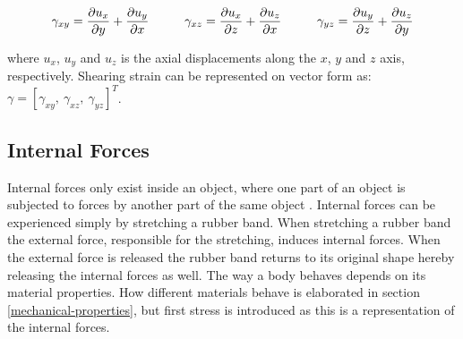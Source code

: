 \begin{equation}
\label{eq:individual-shear-strain}
  \gamma_{xy} = \frac{\partial u_x}{\partial y} +
  \frac{\partial u_y}{\partial x} \hspace{10 mm}
  \gamma_{xz} = \frac{\partial u_x}{\partial z} +
  \frac{\partial u_z}{\partial x} \hspace{10 mm}
  \gamma_{yz} = \frac{\partial u_y}{\partial z} +
  \frac{\partial u_z}{\partial y}
\end{equation}

where $u_x$, $u_y$ and $u_z$ is the axial displacements along the $x$, $y$
and $z$ axis, respectively. Shearing strain can be represented on vector
form as: $\gamma = [ \gamma_{xy}, \ \gamma_{xz}, \ \gamma_{yz} ]^T$.\\




\subsection{Internal Forces}
\label{sec:internal-forces}
Internal forces only exist inside an object, where one part of an
object is subjected to forces by another part of the same object
. 
Internal forces can be experienced simply by stretching a rubber
band. When stretching a rubber band the external force, responsible for
the stretching, induces internal forces. When the external force is
released the rubber band returns to its original shape
hereby releasing the internal forces as well. The way a body behaves
depends on its material properties. How different materials behave is
elaborated in section \vref{mechanical-properties}, but first stress
is introduced as this is a representation of the internal forces.

